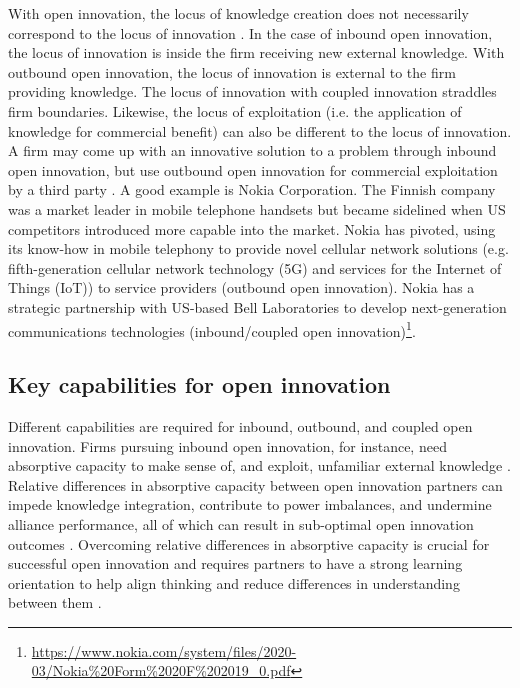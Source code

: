 With open innovation, the locus of knowledge creation does not necessarily correspond to the locus of innovation \citep{gassmann2004towards}. In the case of inbound open innovation, the locus of innovation is inside the firm receiving new external knowledge. With outbound open innovation, the locus of innovation is external to the firm providing knowledge. The locus of innovation with coupled innovation straddles firm boundaries. Likewise, the locus of exploitation (i.e. the application of knowledge for commercial benefit) can also be different to the locus of innovation. A firm may come up with an innovative solution to a problem through inbound open innovation, but use outbound open innovation for commercial exploitation by a third party \citep{gassmann2004towards}. A good example is Nokia Corporation. The Finnish company was a market leader in mobile telephone handsets but became sidelined when US competitors introduced more capable  into the market. Nokia has pivoted, using its know-how in mobile telephony to provide novel cellular network solutions (e.g. fifth-generation cellular network technology (5G) and services for the Internet of Things (IoT)) to service providers (outbound open innovation). Nokia has a strategic partnership with US-based Bell Laboratories to develop next-generation communications technologies (inbound/coupled open innovation)\footnote{\url{https://www.nokia.com/system/files/2020-03/Nokia\%20Form\%2020F\%202019_0.pdf}}.  
 
\subsection{Key capabilities for open innovation}

Different capabilities are required for inbound, outbound, and coupled open innovation. Firms pursuing inbound open innovation, for instance, need absorptive capacity to make sense of, and exploit, unfamiliar external knowledge \citep{vanhaverbeke2007connecting, kokshagina2017fast,bigliardi2021past}. Relative differences in absorptive capacity between open innovation partners can impede knowledge integration, contribute to power imbalances, and undermine alliance performance, all of which can result in sub-optimal open innovation outcomes \citep{lane1998relative,vanhaverbeke2007connecting,zobel2016benefiting,tell2017managing}. Overcoming relative differences in absorptive capacity is crucial for successful open innovation and requires partners to have a strong learning orientation to help align thinking and reduce differences in understanding between them  \citep{nooteboom2000learning,sun2010examination,de2016knowledge}. \medskip

